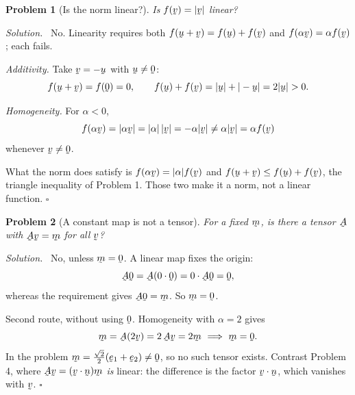 \documentclass[17pt,a4paper]{extreport}
\DeclareRobustCommand{\vek}[1]{\underaccent{\tilde}{#1}}
\newcommand{\bu}{\vek{u}}
\newcommand{\bv}{\vek{v}}
\newcommand{\be}{\vek{e}}
\newcommand{\bmv}{\vek{m}}
\newcommand{\bn}{\vek{n}}
\newcommand{\bze}{\vek{0}}
\newcommand{\bA}{\vek{A}}
\newcommand{\ip}[2]{#1\cdot#2}
\theoremstyle{scplain}
\theoremstyle{scdefn}
\theoremstyle{scplain}
\newtheorem{problem}{Problem}
\newenvironment{solution}
 {\par\smallskip\noindent\textit{Solution.}\ }
 {\hfill$\square$\par\medskip}
\begin{document}
\begin{problem}[Is the norm linear?]
Is $f(\bv)=|\bv|$ linear?
\end{problem}
\begin{solution}
No. Linearity requires both $f(\bu+\bv)=f(\bu)+f(\bv)$ and
$f(\alpha\bv)=\alpha f(\bv)$; each fails.

\emph{Additivity.} Take $\bv=-\bu$ with $\bu\neq\bze$:
\[
   f(\bu+\bv)=f(\bze)=0,\qquad
   f(\bu)+f(\bv)=|\bu|+|-\bu|=2|\bu|>0 .
\]

\emph{Homogeneity.} For $\alpha<0$,
\[
   f(\alpha\bv)=|\alpha\bv|=|\alpha|\,|\bv|=-\alpha|\bv|
   \neq\alpha|\bv|=\alpha f(\bv)
\]
whenever $\bv\neq\bze$.

What the norm does satisfy is $f(\alpha\bv)=|\alpha|f(\bv)$ and
$f(\bu+\bv)\le f(\bu)+f(\bv)$, the triangle inequality of Problem 1. Those
two make it a norm, not a linear function.
\end{solution}

\begin{problem}[A constant map is not a tensor]
For a fixed $\bmv$, is there a tensor $\bA$ with $\bA\bv=\bmv$ for all
$\bv$?
\end{problem}
\begin{solution}
No, unless $\bmv=\bze$. A linear map fixes the origin:
\[
   \bA\bze=\bA(0\cdot\bze)=0\cdot\bA\bze=\bze ,
\]
whereas the requirement gives $\bA\bze=\bmv$. So $\bmv=\bze$.

Second route, without using $\bze$. Homogeneity with $\alpha=2$ gives
\[
   \bmv=\bA(2\bv)=2\,\bA\bv=2\bmv
   \ \Longrightarrow\ \bmv=\bze .
\]
In the problem $\bmv=\tfrac{\sqrt2}{2}(\be_{1}+\be_{2})\neq\bze$, so no
such tensor exists. Contrast Problem 4, where $\bA\bv=(\ip\bv\bn)\bmv$
\emph{is} linear: the difference is the factor $\ip\bv\bn$, which vanishes
with $\bv$.
\end{solution}
\end{document}

